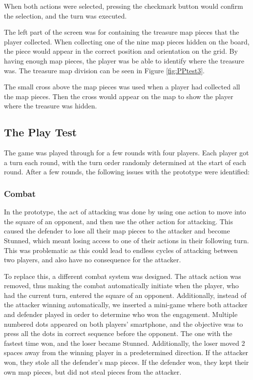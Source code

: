 When both actions were selected, pressing the checkmark button would confirm the selection, and the turn was executed.

The left part of the screen was for containing the treasure map pieces that the player collected. When collecting one of the nine map pieces hidden on the board, the piece would appear in the correct position and orientation on the grid. By having enough map pieces, the player was be able to identify where the treasure was. The treasure map division can be seen in Figure \ref{fig:PPtest3}.

The small cross above the map pieces was used when a player had collected all the map pieces. Then the cross would appear on the map to show the player where the treasure was hidden.

\subsection{The Play Test}
The game was played through for a few rounds with four players. Each player got a turn each round, with the turn order randomly determined at the start of each round.  After a few rounds, the following issues with the prototype were identified:

\subsubsection{Combat}
In the prototype, the act of attacking was done by using one action to move into the square of an opponent, and then use the other action for attacking. This caused the defender to lose all their map pieces to the attacker and become Stunned, which meant losing access to one of their actions in their following turn. This was problematic as this could lead to endless cycles of attacking between two players, and also have no consequence for the attacker.

To replace this, a different combat system was designed. The attack action was removed, thus making the combat automatically initiate when the player, who had the current turn, entered the square of an opponent. Additionally, instead of the attacker winning automatically, we inserted a mini-game where both attacker and defender played in order to determine who won the engagement. Multiple numbered dots appeared on both players’ smartphone, and the objective was to press all the dots in correct sequence before the opponent. The one with the fastest time won, and the loser became Stunned. Additionally, the loser moved 2 spaces away from the winning player in a predetermined direction. If the attacker won, they stole all the defender’s map pieces. If the defender won, they kept their own map pieces, but did not steal pieces from the attacker.

